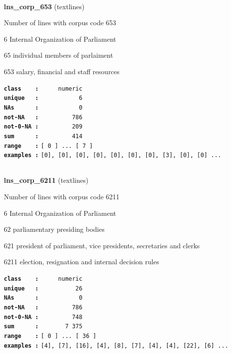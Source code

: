 \documentclass[]{article}
\begin{document}
~

\textbf{lns\_corp\_653} (textlines)

Number of lines with corpus code 653

6 Internal Organization of Parliament

65 individual members of parlaiment

653 salary, financial and staff resources

\textbf{\texttt{class\ \ \ \ :}} \texttt{~~~~~numeric}\\
\textbf{\texttt{unique\ \ \ :}} \texttt{~~~~~~~~~~~6}\\
\textbf{\texttt{NAs\ \ \ \ \ \ :}} \texttt{~~~~~~~~~~~0}\\
\textbf{\texttt{not-NA\ \ \ :}} \texttt{~~~~~~~~~786}\\
\textbf{\texttt{not-0-NA\ :}} \texttt{~~~~~~~~~209}\\
\textbf{\texttt{sum\ \ \ \ \ \ :}} \texttt{~~~~~~~~~414}\\
\textbf{\texttt{range\ \ \ \ :}}
\texttt{{[}\ 0\ {]}\ ...\ {[}\ 7\ {]}}\\
\textbf{\texttt{examples\ :}}
\texttt{{[}0{]},\ {[}0{]},\ {[}0{]},\ {[}0{]},\ {[}0{]},\ {[}0{]},\ {[}0{]},\ {[}3{]},\ {[}0{]},\ {[}0{]}\ ...}\\

~

\textbf{lns\_corp\_6211} (textlines)

Number of lines with corpus code 6211

6 Internal Organization of Parliament

62 parliamentary presiding bodies

621 president of parliament, vice presidents, secretaries and clerks

6211 election, resignation and internal decision rules

\textbf{\texttt{class\ \ \ \ :}} \texttt{~~~~~numeric}\\
\textbf{\texttt{unique\ \ \ :}} \texttt{~~~~~~~~~~26}\\
\textbf{\texttt{NAs\ \ \ \ \ \ :}} \texttt{~~~~~~~~~~~0}\\
\textbf{\texttt{not-NA\ \ \ :}} \texttt{~~~~~~~~~786}\\
\textbf{\texttt{not-0-NA\ :}} \texttt{~~~~~~~~~748}\\
\textbf{\texttt{sum\ \ \ \ \ \ :}} \texttt{~~~~~~~7~375}\\
\textbf{\texttt{range\ \ \ \ :}}
\texttt{{[}\ 0\ {]}\ ...\ {[}\ 36\ {]}}\\
\textbf{\texttt{examples\ :}}
\texttt{{[}4{]},\ {[}7{]},\ {[}16{]},\ {[}4{]},\ {[}8{]},\ {[}7{]},\ {[}4{]},\ {[}4{]},\ {[}22{]},\ {[}6{]}\ ...}\\
\end{document}
